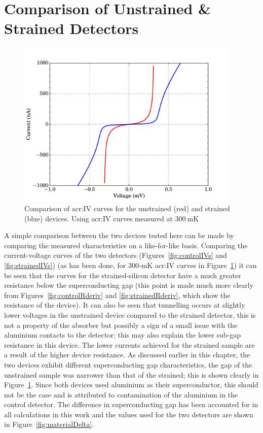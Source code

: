 \section{Comparison of Unstrained \& Strained Detectors}
\label{sec:darkComparison}
\begin{figure}[tb]
\begin{center}
\includegraphics[width = 0.95\textwidth]{figures/IV_comparison}
\caption[Comparison of \gls{acr:IV} curves for the unstrained and strained devices]{Comparison of \gls{acr:IV} curves for the unstrained (red) and strained (blue) devices. Using \gls{acr:IV} curves measured at $300~\mathrm{mK}$}
\label{fig:IVcomparison}
\end{center}
\end{figure}
A simple comparison between the two devices tested here can be made by comparing the measured characteristics on a like-for-like basis. Comparing the current-voltage curves of the two detectors (Figures~\ref{fig:controlIVs} and \ref{fig:strainedIVs}) (as has been done, for 300-mK \gls{acr:IV} curves in Figure~\ref{fig:IVcomparison}) it can be seen that the curves for the strained-silicon detector have a much greater resistance below the superconducting gap (this point is made much more clearly from Figures~\ref{fig:controlRderiv} and \ref{fig:strainedRderiv}, which show the resistance of the device). It can also be seen that tunnelling occurs at slightly lower voltages in the unstrained device compared to the strained detector, this is not a property of the absorber but possibly a sign of a small issue with the aluminium contacts to the detector; this may also explain the lower sub-gap resistance in this device. The lower currents achieved for the strained sample are a result of the higher device resistance. As discussed earlier in this chapter, the two devices  exhibit different superconducting gap characteristics, the gap of the unstrained sample was narrower than that of the strained; this is shown clearly in Figure~\ref{fig:IVcomparison}. Since both devices used aluminium as their superconductor, this should not be the case and is attributed to contamination of the aluminium in the control detector. The difference in superconducting gap has been accounted for in all calculations in this work and the values used for the two detectors are shown in Figure~\ref{fig:materialDelta}.
